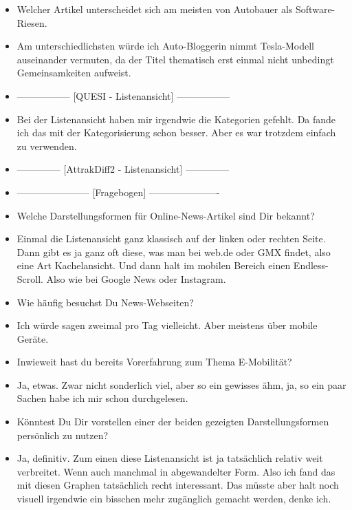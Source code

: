 {\begin{itemize}[]
        \item {} Welcher Artikel unterscheidet sich am meisten von \flqq Autobauer als Software-Riesen\frqq{}.
        \item {} Am unterschiedlichsten würde ich \flqq Auto-Bloggerin nimmt Tesla-Modell auseinander\frqq{} vermuten, da der Titel thematisch erst einmal nicht unbedingt Gemeinsamkeiten aufweist.
        \item {-----------------} [QUESI - Listenansicht] {-----------------}
        \item {} Bei der Listenansicht haben mir irgendwie die Kategorien gefehlt.
              Da fande ich das mit der Kategorisierung schon besser.
              Aber es war trotzdem einfach zu verwenden.
        \item {--------------} [AttrakDiff2 - Listenansicht] {--------------}
        \item {-----------------------} [Fragebogen] {----------------------}
        \item {} Welche Darstellungsformen für Online-News-Artikel sind Dir bekannt?
        \item {} Einmal die Listenansicht ganz klassisch auf der linken oder rechten Seite.
        Dann gibt es ja ganz oft diese, was man bei web.de oder GMX findet, also eine Art Kachelansicht.
        Und dann halt im mobilen Bereich einen Endless-Scroll.
        Also wie bei Google News oder Instagram.
        \item {} Wie häufig besuchst Du News-Webseiten?
        \item {} Ich würde sagen zweimal pro Tag vielleicht. Aber meistens über mobile Geräte.
        \item {} Inwieweit hast du bereits Vorerfahrung zum Thema E-Mobilität?
        \item {} Ja, etwas. Zwar nicht sonderlich viel, aber so ein gewisses ähm, ja, so ein paar Sachen habe ich mir schon durchgelesen.
        \item {} Könntest Du Dir vorstellen einer der beiden gezeigten Darstellungsformen persönlich zu nutzen?
        \item {} Ja, definitiv. Zum einen diese Listenansicht ist ja tatsächlich relativ weit verbreitet.
        Wenn auch manchmal in abgewandelter Form.
        Also ich fand das mit diesen Graphen tatsächlich recht interessant.
        Das müsste aber halt noch visuell irgendwie ein bisschen mehr zugänglich gemacht werden, denke ich.

\end{itemize}}
